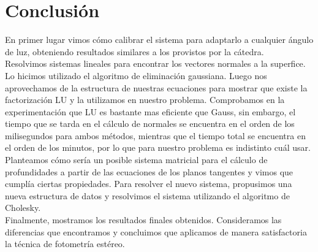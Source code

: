 \section{Conclusión}

En primer lugar vimos cómo calibrar el sistema para adaptarlo a cualquier ángulo de luz, obteniendo resultados similares a los provistos por la cátedra. \\

Resolvimos sistemas lineales para encontrar los vectores normales a la superfice. Lo hicimos utilizado el algoritmo de eliminación gaussiana. Luego nos aprovechamos de la estructura de nuestras ecuaciones para mostrar que existe la factorización LU y la utilizamos en nuestro problema. Comprobamos en la experimentación que LU es bastante mas eficiente que Gauss, sin embargo, el tiempo que se tarda en el cálculo de normales se encuentra en el orden de los milisegundos para ambos métodos, mientras que el tiempo total se encuentra en el orden de los minutos, por lo que para nuestro problema es indistinto cuál usar. \\

Planteamos cómo sería un posible sistema matricial para el cálculo de profundidades a partir de las ecuaciones de los planos tangentes y vimos que cumplía ciertas propiedades. Para resolver el nuevo sistema, propusimos una nueva estructura de datos y resolvimos el sistema utilizando el algoritmo de Cholesky. \\

Finalmente, mostramos los resultados finales obtenidos. Consideramos las diferencias que encontramos y concluimos que aplicamos de manera satisfactoria la técnica de fotometría estéreo. \\

